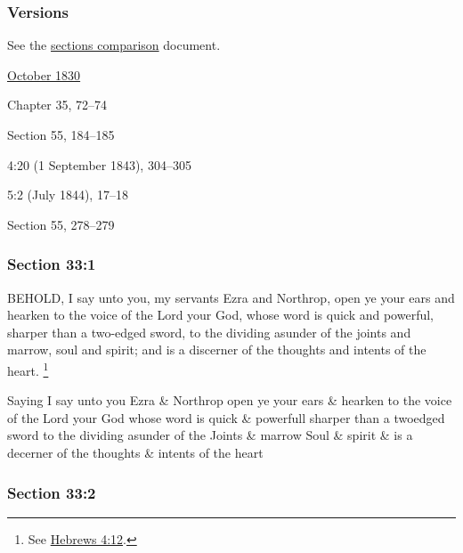 	\subsubsection{Versions}
		\label{DC33-V}
		
		See the \href{https://drive.google.com/file/d/1goAvNz8jS4R8slYfMG_db55Ty2z_vmgK/view?usp=sharing}{sections comparison} document.
	
		\begin{compactdesc}
			\item[JSP] \hyperref[EMS-1830-JS-OCT-1830-B]{October 1830}
			\item[BC] Chapter 35, 72--74
			\item[DC 1835] Section 55, 184--185
			\item[TS] 4:20 (1 September 1843), 304--305
			\item[MS] 5:2 (July 1844), 17--18
			\item[DC 1844] Section 55, 278--279
		\end{compactdesc}

	\subsubsection{Section 33:1} %
		\label{DC33-1}

		BEHOLD, I say unto you, my servants Ezra and Northrop, open ye your ears and hearken to the voice of the Lord your God, whose word is quick and powerful, sharper than a two-edged sword, to the dividing asunder of the joints and marrow, soul and spirit; and is a discerner of the thoughts and intents of the heart.%
			\footnote{%
				See \hyperref[HEBREWS-4-12]{Hebrews 4:12}.
				} 

		\begin{framed}
		\scriptsize
			\begin{compactdesc}
				\item[JSP] Saying I say unto you Ezra \& Northrop open ye your ears \& hearken to the voice of the Lord your God whose word is quick \& powerfull sharper than a twoedged sword to the dividing asunder of the Joints \& marrow Soul \& spirit \& is a decerner of the thoughts \& intents of the heart
			\end{compactdesc}
		\end{framed}

	\subsubsection{Section 33:2} %
		\label{DC33-2}

